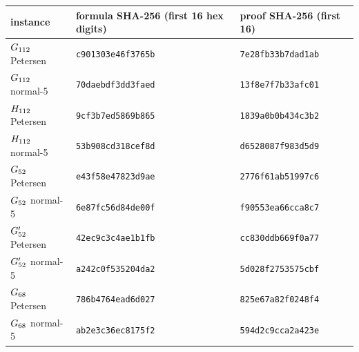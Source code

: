 \begin{tabular}{lll}
\toprule
instance & formula SHA-256 (first 16 hex digits) & proof SHA-256 (first 16)\\
\midrule
$G_{112}$ Petersen & \texttt{c901303e46f3765b} & \texttt{7e28fb33b7dad1ab}\\
$G_{112}$ normal-5 & \texttt{70daebdf3dd3faed} & \texttt{13f8e7f7b33afc01}\\
$H_{112}$ Petersen & \texttt{9cf3b7ed5869b865} & \texttt{1839a0b0b434c3b2}\\
$H_{112}$ normal-5 & \texttt{53b908cd318cef8d} & \texttt{d6528087f983d5d9}\\
$G_{52}$ Petersen & \texttt{e43f58e47823d9ae} & \texttt{2776f61ab51997c6}\\
$G_{52}$ normal-5 & \texttt{6e87fc56d84de00f} & \texttt{f90553ea66cca8c7}\\
$G'_{52}$ Petersen & \texttt{42ec9c3c4ae1b1fb} & \texttt{cc830ddb669f0a77}\\
$G'_{52}$ normal-5 & \texttt{a242c0f535204da2} & \texttt{5d028f2753575cbf}\\
$G_{68}$ Petersen & \texttt{786b4764ead6d027} & \texttt{825e67a82f0248f4}\\
$G_{68}$ normal-5 & \texttt{ab2e3c36ec8175f2} & \texttt{594d2c9cca2a423e}\\
\bottomrule
\end{tabular}
